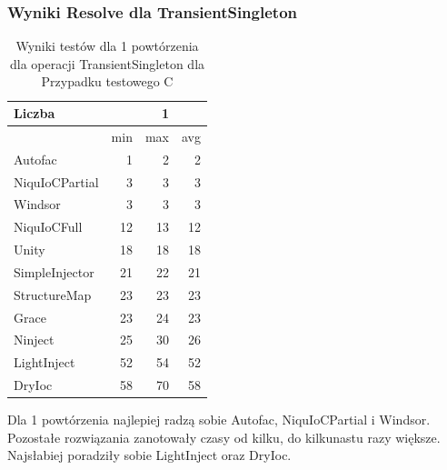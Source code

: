 \documentclass[12pt]{article}
\begin{document}
\subsubsection{Wyniki Resolve dla TransientSingleton}
\begin{table}[H]
\captionsetup{belowskip=0pt,aboveskip=0pt}
\begin{center}
\begin{small}
	\begin{tabular}{ | l | r r r | }
    		\hline
Liczba & & 1 & \\ \hline
 & min & max & avg \\ \hline
Autofac & 1 & 2 & 2 \\ \hline
NiquIoCPartial & 3 & 3 & 3 \\ \hline
Windsor & 3 & 3 & 3 \\ \hline
NiquIoCFull & 12 & 13 & 12 \\ \hline
Unity & 18 & 18 & 18 \\ \hline
SimpleInjector & 21 & 22 & 21 \\ \hline
StructureMap & 23 & 23 & 23 \\ \hline
Grace & 23 & 24 & 23 \\ \hline
Ninject & 25 & 30 & 26 \\ \hline
LightInject & 52 & 54 & 52 \\ \hline
DryIoc & 58 & 70 & 58 \\ \hline
  	\end{tabular}
\end{small}
\end{center}
\caption{Wyniki testów dla 1 powtórzenia dla operacji TransientSingleton dla Przypadku testowego C}
\label{TestCaseC_TransientSingleton1}
\end{table}
Dla 1 powtórzenia najlepiej radzą sobie Autofac, NiquIoCPartial i Windsor. Pozostałe rozwiązania zanotowały czasy od kilku, do kilkunastu razy większe. Najsłabiej poradziły sobie LightInject oraz DryIoc.
\\ \\
\end{document}
